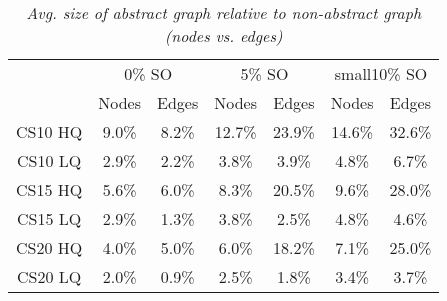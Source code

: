 \begin{table}[ht]
\begin{center}
\caption{\small{\emph{Avg. size of abstract graph relative to non-abstract graph (nodes vs. edges)}}}
\label{aha-table:graphsize}
\begin{tabular*}{0.49\textwidth}{@{\extracolsep{\fill}}ccccccc}%
  \hline
 & \multicolumn{2}{c}{\small{0\% SO}} & \multicolumn{2}{c}{\small{5\% SO}} & \multicolumn{2}{c}{small{10\% SO}} \\
 & \small{Nodes} & \small{Edges} & \small{Nodes} & \small{Edges} & \small{Nodes} & \small{Edges} \\
  \hline
  \small{CS10 HQ} & \small{9.0\%} & \small{8.2\%} & \small{12.7\%} & \small{23.9\%} & \small{14.6\%} & \small{32.6\%} \\
  \small{CS10 LQ} & \small{2.9\%} & \small{2.2\%} & \small{3.8\%}  & \small{3.9\%}  & \small{4.8\%}  & \small{6.7\%} \\
  \small{CS15 HQ} & \small{5.6\%} & \small{6.0\%} & \small{8.3\%}  & \small{20.5\%} & \small{9.6\%}  & \small{28.0\%} \\
  \small{CS15 LQ} & \small{2.9\%} & \small{1.3\%} & \small{3.8\%}  & \small{2.5\%}  & \small{4.8\%}  & \small{4.6\%} \\
  \small{CS20 HQ} & \small{4.0\%} & \small{5.0\%} & \small{6.0\%}  & \small{18.2\%} & \small{7.1\%}  & \small{25.0\%} \\
  \small{CS20 LQ} & \small{2.0\%} & \small{0.9\%} & \small{2.5\%}  & \small{1.8\%}  & \small{3.4\%}  & \small{3.7\%} \\
   \hline
\end{tabular*}
\end{center}
\end{table}
